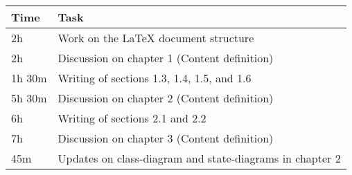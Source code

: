 \begin{center}
    {\renewcommand{\arraystretch}{2}%
    \begin{tabular}{L{2cm}L{12cm}}
        \hline
        \textbf{Time} & \textbf{Task} \\
        \hline
        2h & Work on the LaTeX document structure \\
        \hline
        2h & Discussion on chapter 1 (Content definition) \\
        \hline
        1h 30m& Writing of sections 1.3, 1.4, 1.5, and 1.6 \\
        \hline
        5h 30m & Discussion on chapter 2 (Content definition) \\
        \hline
        6h & Writing of sections 2.1 and 2.2 \\
        \hline
        7h & Discussion on chapter 3 (Content definition) \\
        \hline
        45m & Updates on class-diagram and state-diagrams in chapter 2 \\
    \end{tabular}}
\end{center}